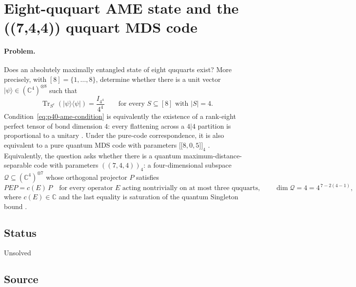 \section{Eight-ququart AME state and the ((7,4,4)) ququart MDS code}
\label{sec:op_b08ad9d4371ed0cb}

\paragraph{Problem.}
Does an absolutely maximally entangled state of eight ququarts exist?  More
precisely, with $[8]=\{1,\ldots,8\}$, determine whether there is a unit vector
$|\psi\rangle\in(\mathbb{C}^{4})^{\otimes 8}$ such that
\begin{equation}
  \operatorname{Tr}_{S^{c}}\!\left(|\psi\rangle\!\langle\psi|\right)
  =\frac{I_{4^{4}}}{4^{4}}
  \qquad\text{for every }S\subseteq[8]\text{ with }|S|=4.
  \label{eq:p40-ame-condition}
\end{equation}
Condition~\eqref{eq:p40-ame-condition} is equivalently the existence of a
rank-eight perfect tensor of bond dimension $4$: every flattening across a
$4|4$ partition is proportional to a unitary
.  Under the pure-code correspondence,
it is also equivalent to a pure quantum MDS code with parameters
$\bigl[\!\bigl[8,0,5\bigr]\!\bigr]_{4}$
.  Equivalently, the question asks whether
there is a quantum maximum-distance-separable code with parameters
$((7,4,4))_{4}$: a four-dimensional subspace
$\mathcal{Q}\subseteq(\mathbb{C}^{4})^{\otimes 7}$ whose orthogonal projector
$P$ satisfies
\begin{equation}
  PEP=c(E)\,P
  \quad\text{for every operator }E\text{ acting nontrivially on at most three ququarts},
  \qquad
  \dim\mathcal{Q}=4=4^{\,7-2(4-1)},
  \label{eq:p40-mds-code}
\end{equation}
where $c(E)\in\mathbb{C}$ and the last equality is saturation of the quantum
Singleton bound .

\subsection*{Status}

Unsolved

\subsection*{Source}

